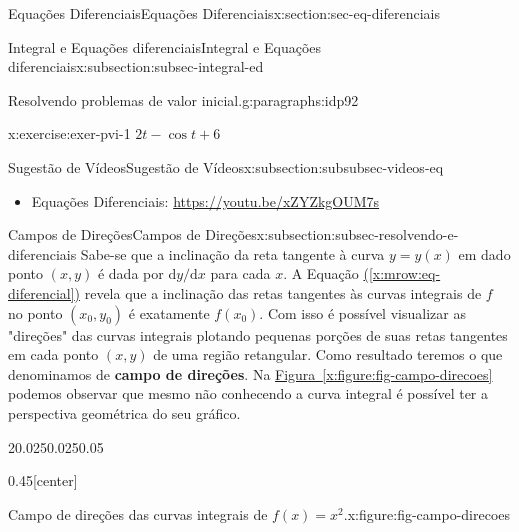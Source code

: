\documentclass[oneside,10pt,]{article}
\newcommand{\xreffont}{\relax}
\newcommand{\terminology}[1]{\textbf{#1}}
\numberwithin{equation}{section}
\newcommand{\dd}{\mathrm{d}}
\begin{document}
\begin{sectionptx}{Equações Diferenciais}{}{Equações Diferenciais}{}{}{x:section:sec-eq-diferenciais}
\begin{subsectionptx}{Integral e Equações diferenciais}{}{Integral e Equações diferenciais}{}{}{x:subsection:subsec-integral-ed}
\begin{paragraphs}{Resolvendo problemas de valor inicial.}{g:paragraphs:idp92}
\begin{inlineexercise}{}{x:exercise:exer-pvi-1}
\noindent\(2t-\cos{t} + 6\)%
\end{inlineexercise}%
\end{paragraphs}%
%
%
\typeout{************************************************}
\typeout{************************************************}
%
\begin{subsectionptx}{Sugestão de Vídeos}{}{Sugestão de Vídeos}{}{}{x:subsection:subsubsec-videos-eq}
%
\begin{itemize}[label=\textbullet]
\item{}Equações Diferenciais: \url{https://youtu.be/xZYZkgOUM7s}%
\end{itemize}
\end{subsectionptx}
\end{subsectionptx}
%
%
\typeout{************************************************}
\typeout{************************************************}
%
\begin{subsectionptx}{Campos de Direções}{}{Campos de Direções}{}{}{x:subsection:subsec-resolvendo-e-diferenciais}
Sabe-se que a inclinação da reta tangente à curva  \(y=y(x)\) em dado ponto \((x, y)\) é dada por \(\dd y/\dd x\) para cada \(x\). A Equação \hyperref[x:mrow:eq-diferencial]{({\xreffont\ref{x:mrow:eq-diferencial}})} revela que a inclinação das retas tangentes às curvas integrais de \(f\) no ponto \((x_0, y_0)\) é exatamente  \(f(x_0)\). Com isso é possível visualizar as "direções" das curvas integrais plotando pequenas porções de suas retas tangentes em cada ponto \((x,y)\)  de uma região retangular. Como resultado teremos o que denominamos de \terminology{campo de direções}. Na \hyperref[x:figure:fig-campo-direcoes]{Figura~{\xreffont\ref{x:figure:fig-campo-direcoes}}\textendash{}{\xreffont\ref{x:figure:fig-campo-direcoes-curva}}} podemos observar que  mesmo não conhecendo a curva integral é possível ter a perspectiva geométrica do seu gráfico.%
\begin{sidebyside}{2}{0.025}{0.025}{0.05}%
\begin{sbspanel}{0.45}[center]%
\begin{figureptx}{Campo de direções das curvas integrais de \(f(x)=x^2\).}{x:figure:fig-campo-direcoes}{}%
%

\end{figureptx}
\end{sbspanel}
\end{sidebyside}
\end{subsectionptx}
\end{sectionptx}
\end{document}
